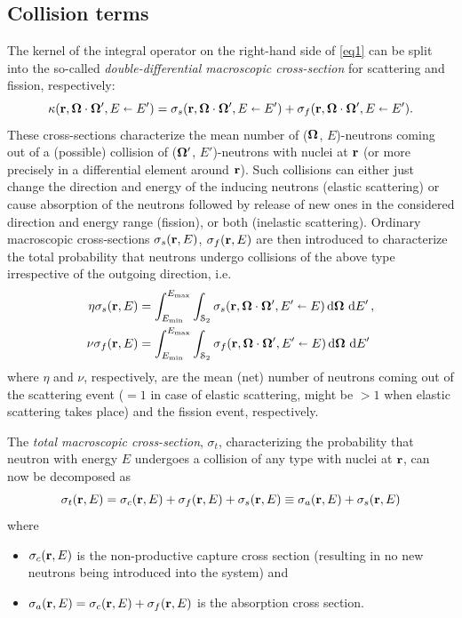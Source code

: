 \subsection{Collision terms}
The kernel of the integral operator on the right-hand side of \eqref{eq1} can be split into the so-called
\textit{double-differential macroscopic cross-section} for scattering and fission, respectively:
\begin{equation}\label{eq:splitting}
  \kappa(\br,\bomega\cdot\bomega',E\sla E') = \sigma_s(\br,\bomega\cdot\bomega',E\sla E') +
  \sigma_f(\br,\bomega\cdot\bomega',E\sla E').
\end{equation}
These cross-sections characterize the mean number of ($\bomega$, $E$)-neutrons coming out of a (possible) collision of 
($\bomega'$, $E'$)-neutrons with nuclei at $\br$ (or more precisely in a
differential element around $\br$). Such collisions can either just change the direction and energy of the
inducing neutrons (elastic scattering) or cause absorption of the neutrons followed by release of
new ones in the considered direction and energy range (fission), or both (inelastic scattering).
Ordinary macroscopic cross-sections $\sigma_s(\br,E)$, $\sigma_f(\br,E)$ are then introduced to characterize the total
probability that neutrons undergo collisions of the above type irrespective of the outgoing direction, i.e.
\begin{equation}\label{eq:ddifxs}
\begin{aligned}
\eta\sigma_s(\br, E) &= \intE[']{\Emin}{\Emax}{\intA{\sigma_s(\br,\bomega\cdot\bomega', 
	E'\sla E)}},\\
\nu\sigma_f(\br, E) &= \intE[']{\Emin}{\Emax}{\intA{\sigma_f(\br,\bomega\cdot\bomega', 
	E'\sla E)}}
\end{aligned}
\end{equation}
where $\eta$ and $\nu$, respectively, are the mean (net) number of neutrons coming out of the scattering event ($=1$ in
case of elastic scattering, might be $> 1$ when elastic scattering takes place) and the fission event, respectively. 

The \textit{total macroscopic cross-section}, $\sigma_t$, characterizing the probability that neutron with energy $E$
undergoes a collision of any type with nuclei at $\br$, can now be decomposed as 
\begin{equation}\label{eq:st}
  \sigma_t(\br,E) = \sigma_c(\br,E) + \sigma_f(\br,E) + \sigma_s(\br,E) \equiv \sigma_a(\br,E) + \sigma_s(\br,E)
\end{equation}
where
\begin{itemize}
	\item $\sigma_c(\br, E)$ is the non-productive capture cross section (resulting in no new neutrons being introduced
	into the system) and
  	\item $\sigma_a(\br, E) = \sigma_c(\br,E) + \sigma_f(\br,E)$ is the absorption cross section.
\end{itemize}

